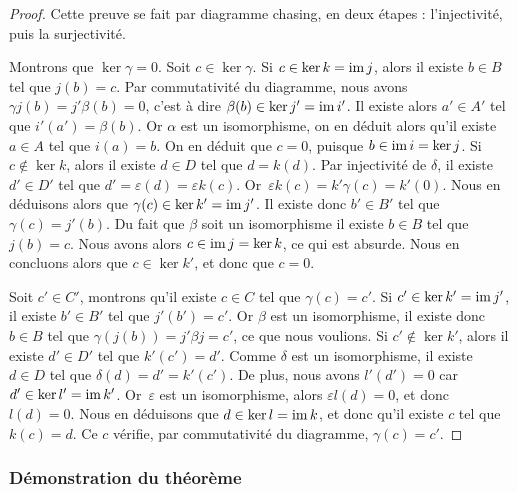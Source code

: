 \begin{proof}
Cette preuve se fait par diagramme chasing, en deux étapes : l'injectivité, puis la surjectivité.

Montrons que $\ker\gamma=0$. Soit $c\in \ker\gamma$. Si $c\in \ker k=\mathrm{im}\, j$, alors il existe $b\in B$ tel que $j(b)=c$. Par commutativité du diagramme, nous avons $\gamma j(b)=j'\beta(b)=0$, c'est à dire $\beta(b)\in\ker j'=\mathrm{im}\, i'$. Il existe alors $a'\in A'$ tel que $i'(a')=\beta(b)$. Or $\alpha$ est un isomorphisme, on en déduit alors qu'il existe~$a\in A$ tel que $i(a)=b$. On en déduit que $c=0$, puisque $b\in \mathrm{im}\, i=\ker j$. Si $c\notin\ker k$, alors il  existe $d\in D$ tel que $d=k(d)$. Par injectivité de $\delta$, il existe $d'\in D'$ tel que $d'=\varepsilon(d)=\varepsilon k(c)$. Or~$\varepsilon k(c)=k'\gamma(c)=k'(0)$. Nous en déduisons alors que $\gamma(c)\in\ker k'=\mathrm{im}\, j'$. Il existe donc $b'\in B'$ tel que $\gamma(c)=j'(b)$. Du fait que $\beta$ soit un isomorphisme il existe $b\in B$ tel que $j(b)=c$. Nous avons alors $c\in\mathrm{im}\, j=\ker k$, ce qui est absurde. Nous en concluons alors que $c\in \ker k'$, et donc que $c=0$.

Soit $c'\in C'$, montrons qu'il existe $c\in C$ tel que $\gamma(c)=c'$. Si $c'\in\ker k'=\mathrm{im}\, j'$, il existe $b'\in B'$ tel que $j'(b')=c'$. Or $\beta$ est un isomorphisme, il existe donc $b\in B$ tel que $\gamma(j(b))=j'\beta j=c'$, ce que nous voulions. Si $c'\notin\ker k'$, alors il existe $d'\in D'$ tel que $k'(c')=d'$. Comme $\delta$ est un isomorphisme, il existe $d\in D$ tel que $\delta(d)=d'=k'(c')$. De plus, nous avons $l'(d')=0$ car $d'\in\ker l'=\mathrm{im}\, k'$. Or~$\varepsilon$ est un isomorphisme, alors $\varepsilon l(d)=0$, et donc $l(d)=0$. Nous en déduisons que $d\in\ker l=\mathrm{im}\, k$, et donc qu'il existe $c$ tel que $k(c)=d$. Ce $c$ vérifie, par commutativité du diagramme, $\gamma(c)=c'$.
\end{proof}

\subsubsection{Démonstration du théorème}

